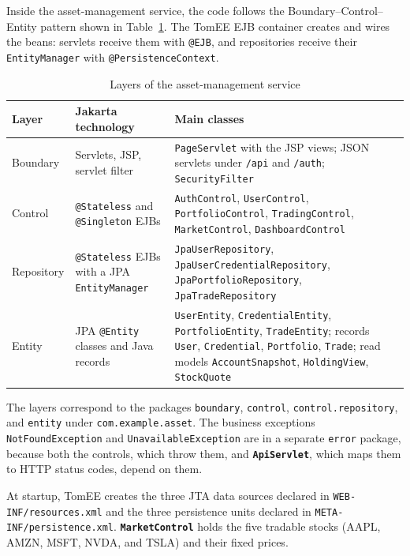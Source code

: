 \documentclass[12pt,a4paper]{article}
\newcommand{\code}[1]{\texttt{\small #1}}
\newcommand{\class}[1]{\textbf{\code{#1}}}
\begin{document}
Inside the asset-management service, the code follows the
Boundary--Control--Entity pattern shown in Table~\ref{tab:layers}. The TomEE
EJB container creates and wires the beans: servlets receive them with
\code{@EJB}, and repositories receive their \code{EntityManager} with
\code{@PersistenceContext}.

\begin{table}[htbp]
\centering
\small
\begin{tabularx}{\textwidth}{>{\raggedright\arraybackslash}p{2.4cm}
                             >{\raggedright\arraybackslash}p{3.4cm}
                             >{\raggedright\arraybackslash}X}
\toprule
\textbf{Layer} & \textbf{Jakarta technology} & \textbf{Main classes}\\
\midrule
Boundary & Servlets, JSP, servlet filter & \code{PageServlet} with the JSP
views; JSON servlets under \code{/api} and \code{/auth};
\code{SecurityFilter}\\
Control & \code{@Stateless} and \code{@Singleton} EJBs & \code{AuthControl},
\code{UserControl}, \code{PortfolioControl}, \code{TradingControl},
\code{MarketControl}, \code{DashboardControl}\\
Repository & \code{@Stateless} EJBs with a JPA \code{EntityManager} &
\code{JpaUserRepository}, \code{JpaUserCredentialRepository},
\code{JpaPortfolioRepository}, \code{JpaTradeRepository}\\
Entity & JPA \code{@Entity} classes and Java records & \code{UserEntity},
\code{CredentialEntity}, \code{PortfolioEntity}, \code{TradeEntity}; records
\code{User}, \code{Credential}, \code{Portfolio}, \code{Trade}; read models
\code{AccountSnapshot}, \code{HoldingView}, \code{StockQuote}\\
\bottomrule
\end{tabularx}
\caption{Layers of the asset-management service}
\label{tab:layers}
\end{table}

The layers correspond to the packages \code{boundary}, \code{control},
\code{control.repository}, and \code{entity} under \code{com.example.asset}.
The business exceptions \code{NotFoundException} and
\code{UnavailableException} are in a separate \code{error} package, because
both the controls, which throw them, and \class{ApiServlet}, which maps them
to HTTP status codes, depend on them.

At startup, TomEE creates the three JTA data sources declared in
\code{WEB-INF/resources.xml} and the three persistence units declared in
\code{META-INF/persistence.xml}. \class{MarketControl} holds the
five tradable stocks (AAPL, AMZN, MSFT, NVDA, and TSLA) and their fixed
prices.
\end{document}
